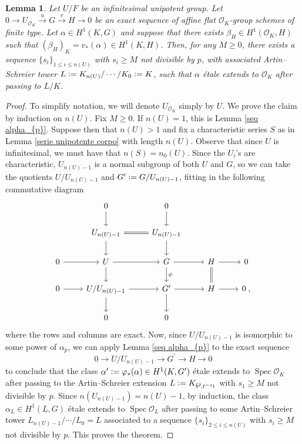\documentclass[a4paper,english,12pt]{amsart}
\newtheorem{lemma}[definition]{Lemma}
\numberwithin{equation}{section}
\newcommand{\defeq}{\vcentcolon=}
\DeclareMathOperator{\Spec}{Spec}
\renewcommand{\leq}{\leqslant}
\renewcommand{\geq}{\geqslant}
\renewcommand{\wp}{\ensuremath\raisebox{\depth}{$\mathchar"17D$}}
\renewcommand{\_}{\rule{0.25cm}{0.4pt}}
\begin{document}
\begin{lemma}\label{seq unipotente inf}
    Let $U/F$ be an infinitesimal unipotent group. Let $0\to U_{\mathcal{O}_{K}}\xrightarrow{u} G\xrightarrow{v} H\to 0$ be an exact sequence of affine flat $\mathcal{O}_{K}$-group schemes of finite type. Let $\alpha\in H^{1}(K,G)$ and suppose that there exists $\beta_{H}\in H^{1}(\mathcal{O}_{K},H)$ such that $(\beta_{H})_{K}=v_{\ast}(\alpha)\in H^{1}(K,H)$. Then, for any $M\geq 0$, there exists a sequence $\{s_{i}\}_{1\leq i\leq n(U)}$ with $s_{i}\geq M$ not divisible by $p$, with associated Artin--Schreier tower $L\defeq K_{n(U)}/\cdots/K_{0}\defeq K$, such that $\alpha$ étale extends to $\mathcal{O}_{K}$ after passing to $L/K$.
\end{lemma}
\begin{proof}
    To simplify notation, we will denote $U_{\mathcal{O}_{K}}$ simply by $U$. We prove the claim by induction on $n(U)$. Fix $M\geq 0$. If $n(U)=1$, this is Lemma \ref{seq alpha_{p}}. Suppose then that $n(U)>1$ and fix a characteristic series $S$ as in Lemma \ref{serie unipotente corpo} with length $n(U)$. Observe that since $U$ is infinitesimal, we must have that $n(S)=n_{0}(U)$. Since the $U_{i}$'s are characteristic, $U_{n(U)-1}$ is a normal subgroup of both $U$ and $G$, so we can take the quotients $U/U_{n(U)-1}$ and $G^{\prime}\defeq G/U_{n(U)-1}$, fitting in the following commutative diagram 
    \[
    \begin{tikzcd}
        & 0\ar[d] & 0\ar[d]
        \\
        & U_{n(U)-1}\ar[d]\ar[r, equal] & U_{n(U)-1}\ar[d]
        \\
        0\ar[r] & U\ar[r]\ar[d] & G\ar[r]\ar[d, "\phi"] & H\ar[r]\ar[d, equal] & 0
        \\
        0\ar[r] & U/U_{n(U)-1} \ar[r]\ar[d] & G^{\prime}\ar[r]\ar[d] & H\ar[r] & 0\;,
        \\
        & 0 & 0
    \end{tikzcd}
    \]
    where the rows and columns are exact. Now, since $U/U_{n(U)-1}$ is isomorphic to some power of $\alpha_{p}$, we can apply Lemma \ref{seq alpha_{p}} to the exact sequence
    \[
    0\to U/U_{n(U)-1}\to G^{\prime}\to H\to 0
    \]
    to conclude that the class $\alpha^{\prime}\defeq \varphi_{\ast}(\alpha)\in H^{1}(K,G^{\prime})$ étale extends to $\Spec \mathcal{O}_{K}$ after passing to the Artin--Schreier extension $L\defeq K_{\wp,t^{-s_{1}}}$ with $s_{1}\geq M$ not divisible by $p$. Since $n(U_{n(U)-1})=n(U)-1$, by induction, the class $\alpha_{L}\in H^{1}(L,G)$ étale extends to $\Spec \mathcal{O}_{L}$ after passing to some Artin--Schreier tower $L_{n(U)-1}/\cdots/L_{0}=L$ associated to a sequence $\{s_{i}\}_{2\leq i\leq n(U)}$ with $s_{i}\geq M$ not divisible by $p$. This proves the theorem.
\end{proof}
\end{document}
